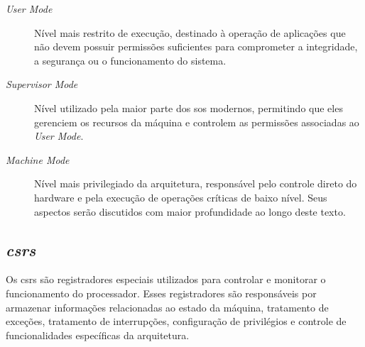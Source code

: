 \begin{description}

	\item[\textit{User Mode}]
		Nível mais restrito de execução, destinado à operação de aplicações que não devem possuir permissões suficientes para comprometer a
		integridade, a segurança ou o funcionamento do sistema.

	\item[\textit{Supervisor Mode}]
		Nível utilizado pela maior parte dos \glspl{so} modernos, permitindo que eles gerenciem os recursos da máquina e controlem as 
		permissões associadas ao \textit{User Mode}.

	\item[\textit{Machine Mode}]
		Nível mais privilegiado da arquitetura, responsável pelo controle direto do hardware e pela execução de operações críticas de baixo nível.
		Seus aspectos serão discutidos com maior profundidade ao longo deste texto.

\end{description}

\subsection{\textit{\Glspl{csr}}}

Os \glspl{csr} são registradores especiais utilizados para controlar e monitorar o funcionamento do processador.
Esses registradores são responsáveis por armazenar informações relacionadas ao estado da máquina, tratamento de exceções, tratamento de interrupções,
configuração de privilégios e controle de funcionalidades específicas da arquitetura.
